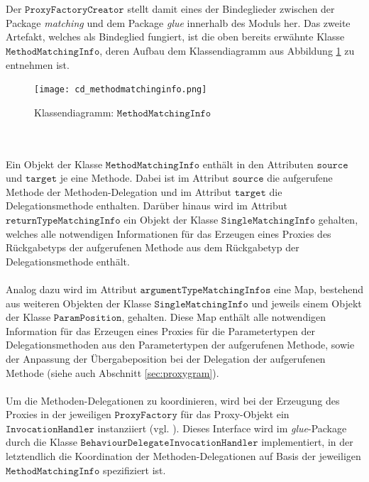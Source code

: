 \\\\
Der $\texttt{ProxyFactoryCreator}$ stellt damit eines der Bindeglieder zwischen der Package \emph{matching} und dem Package \emph{glue} innerhalb des Moduls her. Das zweite Artefakt, welches als Bindeglied fungiert, ist die oben bereits erwähnte Klasse $\texttt{MethodMatchingInfo}$, deren Aufbau dem Klassendiagramm aus Abbildung \ref{cd_methodMatchingInfo} zu entnehmen ist.
\begin{figure}[h!]
\texttt{[image: cd\_methodmatchinginfo.png]}
\caption{Klassendiagramm: $\texttt{MethodMatchingInfo}$}
\label{cd_methodMatchingInfo}
\end{figure}
\noindent
\\\\
Ein Objekt der Klasse $\texttt{MethodMatchingInfo}$ enthält in den Attributen $\texttt{source}$ und $\texttt{target}$ je eine Methode. Dabei ist im Attribut $\texttt{source}$ die aufgerufene Methode der Methoden-Delegation und im Attribut $\texttt{target}$ die Delegationsmethode enthalten. Darüber hinaus wird im Attribut $\texttt{returnTypeMatchingInfo}$ ein Objekt der Klasse $\texttt{SingleMatchingInfo}$ gehalten, welches alle notwendigen Informationen für das Erzeugen eines Proxies des Rückgabetyps der aufgerufenen Methode aus dem Rückgabetyp der Delegationsmethode enthält.
\\\\
Analog dazu wird im Attribut $\texttt{argumentTypeMatchingInfos}$ eine Map, bestehend aus weiteren Objekten der Klasse $\texttt{SingleMatchingInfo}$ und jeweils einem Objekt der Klasse $\texttt{ParamPosition}$, gehalten. Diese Map enthält alle notwendigen Information für das Erzeugen eines Proxies für die Parametertypen der Delegationsmethoden aus den Parametertypen der aufgerufenen Methode, sowie der Anpassung der Übergabeposition bei der Delegation der aufgerufenen Methode (siehe auch Abschnitt \ref{sec:proxygram}).
\\\\
Um die Methoden-Delegationen zu koordinieren, wird bei der Erzeugung des Proxies in der jeweiligen $\texttt{ProxyFactory}$ für das Proxy-Objekt ein $\texttt{InvocationHandler}$ instanziiert (vgl. \cite{invocationhandler}). Dieses Interface wird im \emph{glue}-Package durch die Klasse $\texttt{BehaviourDelegateInvocationHandler}$ implementiert, in der letztendlich die Koordination der Methoden-Delegationen auf Basis der jeweiligen $\texttt{MethodMatchingInfo}$ spezifiziert ist.
\\\\
